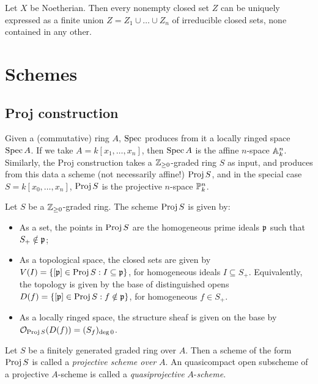 \documentclass[11pt]{amsart}
\begin{document}
\begin{prop}
Let $X$ be Noetherian. Then every nonempty closed set $Z$ can be uniquely expressed as a finite union $Z = Z_1\cup \dots \cup Z_n$ of irreducible closed sets, none contained in any other.
\end{prop}


\section{Schemes}

\subsection{Proj construction}
\label{proj_construction}

Given a (commutative) ring $A$, $\Spec$ produces from it a locally ringed space $\Spec A$. If we take $A = k[x_1,\dots,x_n]$, then $\Spec A$ is the affine $n$-space $\AA^n_k$. Similarly, the Proj construction takes a $\ZZ_{\ge 0}$-graded ring $S$ as input, and produces from this data a scheme (not necessarily affine!) $\Proj S$, and in the special case $S = k[x_0,\dots,x_n]$, $\Proj S$ is the projective $n$-space $\PP^n_k$.

\begin{defn}
\label{proj}
Let $S$ be a $\ZZ_{\ge 0}$-graded ring. The scheme $\Proj S$ is given by:
\begin{itemize}
    \item As a set, the points in $\Proj S$ are the homogeneous prime ideals $\fp$ such that $S_+ \notin \fp$;
    \item As a topological space, the closed sets are given by $V(I) = \{[\fp] \in \Proj S: I\subseteq \fp\}$, for homogeneous ideals $I\subseteq S_+$. Equivalently, the topology is given by the base of distinguished opens $D(f) = \{[\fp] \in \Proj S: f\notin \fp\}$, for homogeneous $f\in S_+$.
    \item As a locally ringed space, the structure sheaf is given on the base by $\cO_{\Proj S}(D(f)) = (S_f)_{\deg 0}$.
\end{itemize}
\end{defn}

\begin{defn}
Let $S$ be a finitely generated graded ring over $A$. Then a scheme of the form $\Proj S$ is called a \emph{projective scheme over} $A$. An quasicompact open subscheme of a projective $A$-scheme is called a \emph{quasiprojective} $A$-\emph{scheme}.
\end{defn}
\end{document}
